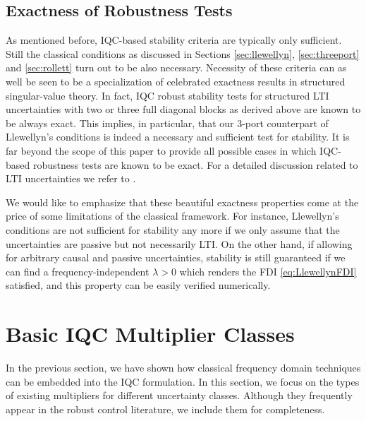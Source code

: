 \subsection{Exactness of Robustness Tests}\label{sec:exact}
As mentioned before, IQC-based stability criteria are typically only sufficient.
Still the classical conditions as discussed in Sections \ref{sec:llewellyn}, \ref{sec:threeport} and \ref{sec:rollett}
turn out to be also necessary. Necessity of these criteria can as well be seen to be a specialization of
celebrated exactness results in structured singular-value theory. In fact, IQC robust stability tests
for structured LTI uncertainties with two or three full diagonal blocks as derived above are known to be always exact.
This implies, in particular, that our 3-port counterpart of Llewellyn's conditions is indeed
a necessary and sufficient test for stability. It is far beyond the scope of this paper to provide
all possible cases in which IQC-based robustness tests are known to be exact. For a detailed discussion related
to LTI uncertainties we refer to \cite{packdoyle,fantits,cwssimax}.

We would like to emphasize that these beautiful exactness properties come at the price of some limitations of the classical framework. For instance, Llewellyn's conditions are not sufficient for stability any more if we only assume that the uncertainties are passive but not necessarily LTI. On the other hand, if allowing for arbitrary causal and passive uncertainties, stability is still guaranteed if we can find a frequency-independent $\lambda>0$ which renders the FDI \eqref{eq:LlewellynFDI} satisfied, and this property can be easily verified numerically.





\section{Basic IQC Multiplier Classes}
In the previous section, we have shown how classical frequency domain techniques can be embedded into the IQC formulation. In this section, we focus on the types of existing multipliers for different uncertainty classes. Although they frequently appear in the robust control literature, we include them for completeness.



